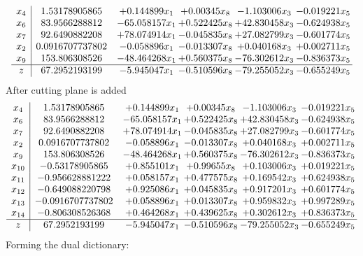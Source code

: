 \documentclass[11pt]{article}
\begin{document}
\[\begin{array}{c| c c@{\hskip 2pt} c@{\hskip 2pt} c@{\hskip 2pt} c@{\hskip 2pt} }
 x_{4}   &  1.53178905865 & + 0.144899 x_{1} & + 0.00345 x_{8} & -1.103006 x_{3} & -0.019221 x_{5}\\
 x_{6}   &  83.9566288812 & -65.058157 x_{1} & + 0.522425 x_{8} & + 42.830458 x_{3} & -0.624938 x_{5}\\
 x_{7}   &  92.6490882208 & + 78.074914 x_{1} & -0.045835 x_{8} & + 27.082799 x_{3} & -0.601774 x_{5}\\
 x_{2}   &  0.0916707737802 & -0.058896 x_{1} & -0.013307 x_{8} & + 0.040168 x_{3} & + 0.002711 x_{5}\\
 x_{9}   &  153.806308526 & -48.464268 x_{1} & + 0.560375 x_{8} & -76.302612 x_{3} & -0.836373 x_{5}\\
\hline
z    &  67.2952193199 & -5.945047 x_{1} & -0.510596 x_{8} & -79.255052 x_{3} & -0.655249 x_{5}\\
\end{array}\]
 After cutting plane is added 
\[\begin{array}{c| c c@{\hskip 2pt} c@{\hskip 2pt} c@{\hskip 2pt} c@{\hskip 2pt} }
 x_{4}   &  1.53178905865 & + 0.144899 x_{1} & + 0.00345 x_{8} & -1.103006 x_{3} & -0.019221 x_{5}\\
 x_{6}   &  83.9566288812 & -65.058157 x_{1} & + 0.522425 x_{8} & + 42.830458 x_{3} & -0.624938 x_{5}\\
 x_{7}   &  92.6490882208 & + 78.074914 x_{1} & -0.045835 x_{8} & + 27.082799 x_{3} & -0.601774 x_{5}\\
 x_{2}   &  0.0916707737802 & -0.058896 x_{1} & -0.013307 x_{8} & + 0.040168 x_{3} & + 0.002711 x_{5}\\
 x_{9}   &  153.806308526 & -48.464268 x_{1} & + 0.560375 x_{8} & -76.302612 x_{3} & -0.836373 x_{5}\\
 x_{10}   &  -0.53178905865 & + 0.855101 x_{1} & + 0.99655 x_{8} & + 0.103006 x_{3} & + 0.019221 x_{5}\\
 x_{11}   &  -0.956628881222 & + 0.058157 x_{1} & + 0.477575 x_{8} & + 0.169542 x_{3} & + 0.624938 x_{5}\\
 x_{12}   &  -0.649088220798 & + 0.925086 x_{1} & + 0.045835 x_{8} & + 0.917201 x_{3} & + 0.601774 x_{5}\\
 x_{13}   &  -0.0916707737802 & + 0.058896 x_{1} & + 0.013307 x_{8} & + 0.959832 x_{3} & + 0.997289 x_{5}\\
 x_{14}   &  -0.806308526368 & + 0.464268 x_{1} & + 0.439625 x_{8} & + 0.302612 x_{3} & + 0.836373 x_{5}\\
\hline
z    &  67.2952193199 & -5.945047 x_{1} & -0.510596 x_{8} & -79.255052 x_{3} & -0.655249 x_{5}\\
\end{array}\]
Forming the dual dictionary:
\end{document}
